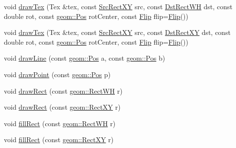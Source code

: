 \begin{DoxyCompactItemize}
\item 
void \mbox{\hyperlink{classrolmodl_1_1blend_mode_1_1_ren_a46ea13b005400ddae8dfc3ce4af10cdd}{draw\+Tex}} (Tex \&tex, const \mbox{\hyperlink{structrolmodl_1_1blend_mode_1_1_src_rect_x_y}{Src\+Rect\+XY}} src, const \mbox{\hyperlink{structrolmodl_1_1blend_mode_1_1_dst_rect_w_h}{Dst\+Rect\+WH}} dst, const double rot, const \mbox{\hyperlink{structrolmodl_1_1geom_1_1_pos}{geom\+::\+Pos}} rot\+Center, const \mbox{\hyperlink{structrolmodl_1_1blend_mode_1_1_flip}{Flip}} flip=\mbox{\hyperlink{structrolmodl_1_1blend_mode_1_1_flip}{Flip}}())
\item 
void \mbox{\hyperlink{classrolmodl_1_1blend_mode_1_1_ren_ab545f0e67db599adf2cb7fc9a42ca91c}{draw\+Tex}} (Tex \&tex, const \mbox{\hyperlink{structrolmodl_1_1blend_mode_1_1_src_rect_x_y}{Src\+Rect\+XY}} src, const \mbox{\hyperlink{structrolmodl_1_1blend_mode_1_1_dst_rect_x_y}{Dst\+Rect\+XY}} dst, const double rot, const \mbox{\hyperlink{structrolmodl_1_1geom_1_1_pos}{geom\+::\+Pos}} rot\+Center, const \mbox{\hyperlink{structrolmodl_1_1blend_mode_1_1_flip}{Flip}} flip=\mbox{\hyperlink{structrolmodl_1_1blend_mode_1_1_flip}{Flip}}())
\item 
void \mbox{\hyperlink{classrolmodl_1_1blend_mode_1_1_ren_a4daeaac6e1895a42e8814500a38bbd97}{draw\+Line}} (const \mbox{\hyperlink{structrolmodl_1_1geom_1_1_pos}{geom\+::\+Pos}} a, const \mbox{\hyperlink{structrolmodl_1_1geom_1_1_pos}{geom\+::\+Pos}} b)
\item 
void \mbox{\hyperlink{classrolmodl_1_1blend_mode_1_1_ren_a9e1d17fc3a0cfa1a9de3ecfc535d3be9}{draw\+Point}} (const \mbox{\hyperlink{structrolmodl_1_1geom_1_1_pos}{geom\+::\+Pos}} p)
\item 
void \mbox{\hyperlink{classrolmodl_1_1blend_mode_1_1_ren_a1e13b8aaf46e5135b13bca599284f59f}{draw\+Rect}} (const \mbox{\hyperlink{structrolmodl_1_1geom_1_1_rect_w_h}{geom\+::\+Rect\+WH}} r)
\item 
void \mbox{\hyperlink{classrolmodl_1_1blend_mode_1_1_ren_a856179e4d199af8caef8afb29fa336ad}{draw\+Rect}} (const \mbox{\hyperlink{structrolmodl_1_1geom_1_1_rect_x_y}{geom\+::\+Rect\+XY}} r)
\item 
void \mbox{\hyperlink{classrolmodl_1_1blend_mode_1_1_ren_a9faa2755991e87046b45a4cb8956eb74}{fill\+Rect}} (const \mbox{\hyperlink{structrolmodl_1_1geom_1_1_rect_w_h}{geom\+::\+Rect\+WH}} r)
\item 
void \mbox{\hyperlink{classrolmodl_1_1blend_mode_1_1_ren_acb99591b99d2fe6440463f976ce1db66}{fill\+Rect}} (const \mbox{\hyperlink{structrolmodl_1_1geom_1_1_rect_x_y}{geom\+::\+Rect\+XY}} r)

\end{DoxyCompactItemize}
